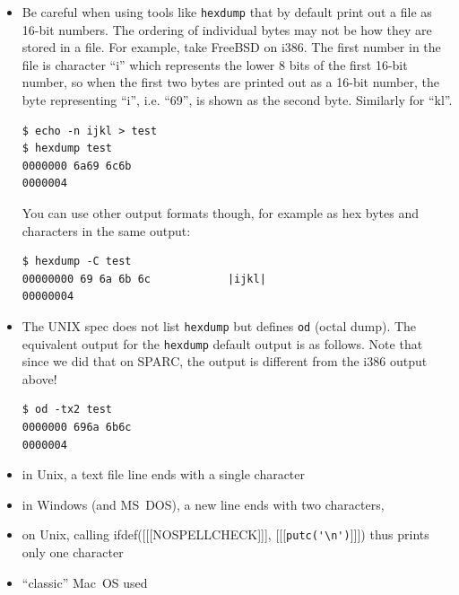 \begin{itemize}
\item Be careful when using tools like \texttt{hexdump} that by default print
out a file as 16-bit numbers.  The ordering of individual bytes may not be how
they are stored in a file.  For example, take FreeBSD on i386.  The first number
in the file is character ``i'' which represents the lower 8 bits of the first 16-bit
number, so when the first two bytes are printed out as a 16-bit number, the byte
representing ``i'', i.e. ``69'', is shown as the second byte.  Similarly for
``kl''.

\begin{verbatim}
$ echo -n ijkl > test
$ hexdump test
0000000 6a69 6c6b
0000004
\end{verbatim}

You can use other output formats though, for example as hex bytes and
characters in the same output:

\begin{verbatim}
$ hexdump -C test 
00000000 69 6a 6b 6c            |ijkl|
00000004
\end{verbatim}

\item The UNIX spec does not list \texttt{hexdump} but defines \texttt{od}
(octal dump).  The equivalent output for the \texttt{hexdump} default output is
as follows.  Note that since we did that on SPARC, the output is different from
the i386 output above!

\begin{verbatim}
$ od -tx2 test
0000000 696a 6b6c
0000004
\end{verbatim}
\end{itemize}


\begin{slide}
\begin{itemize}
\item in Unix, a text file line ends with a single character 
\item in Windows (and MS~DOS), a new line ends with two characters, 
\item on Unix, calling ifdef([[[NOSPELLCHECK]]], [[[\verb.putc('\n').]]])
thus prints only one character
\item ``classic'' Mac~OS used 
\end{itemize}
\end{slide}

